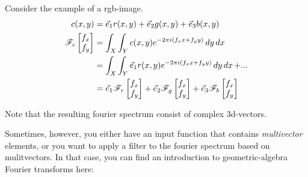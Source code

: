 Consider the example of a rgb-image.
\begin{equation}
    \begin{split}
        c(x,y) &= \vec{e}_1 r(x,y) + \vec{e}_2 g(x,y) + \vec{e}_3 b(x,y) \\
        \mathscr{F}_c\begin{bmatrix} f_x \\ f_y \end{bmatrix} 
                        &= \int_X \int_Y c(x,y) e^{-2\pi i (f_xx + f_yy)} \mathop{dy} \mathop{dx} \\
                        &= \int_X \int_Y \vec{e}_1 r(x,y) e^{-2\pi i (f_xx + f_yy)} \mathop{dy} \mathop{dx} + ... \\
                        &= \vec{e}_1 \mathscr{F}_r\begin{bmatrix} f_x \\ f_y \end{bmatrix} + \vec{e}_2 \mathscr{F}_g\begin{bmatrix} f_x \\ f_y \end{bmatrix} + \vec{e}_3 \mathscr{F}_b\begin{bmatrix} f_x \\ f_y \end{bmatrix} 
    \end{split}
\end{equation}

Note that the resulting fourier spectrum consist of complex 3d-vectors.

Sometimes, however, you either have an input function that contains \emph{multivector} elements, or you want to apply a filter to the fourier spectrum based on mulitvectors. In that case, you can find an introduction to geometric-algebra Fourier transforms here: 